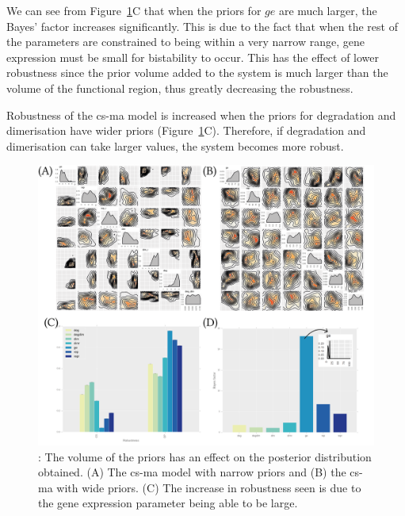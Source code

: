 We can see from Figure~\ref{fig:priors_matter}C that when the priors for $ge$ are much larger, the Bayes' factor increases significantly. This is due to the fact that when the rest of the parameters are constrained to being within a very narrow range, gene expression must be small for bistability to occur. This has the effect of lower robustness since the prior volume added to the system is much larger than the volume of the functional region, thus greatly decreasing the robustness.

Robustness of the \acrshort{cs-ma} model is increased when the priors for degradation and dimerisation have wider priors (Figure~\ref{fig:priors_matter}C). Therefore, if degradation and dimerisation can take larger values, the system becomes more robust.
 

\begin{figure}[h]
\begin{center}
\includegraphics[width=\textwidth]{../../chapters/chapterStabilityFinder/images/priors_matter.png}
\caption[The volume of the priors has an effect on the posterior distribution obtained.]{ \label{fig:priors_matter}: The volume of the priors has an effect on the posterior distribution obtained. (A) The \acrshort{cs-ma} model with narrow priors and (B) the \acrshort{cs-ma} with wide priors. (C) The increase in robustness seen is due to the gene expression parameter being able to be large.}
\end{center}
\end{figure}
\clearpage
 
